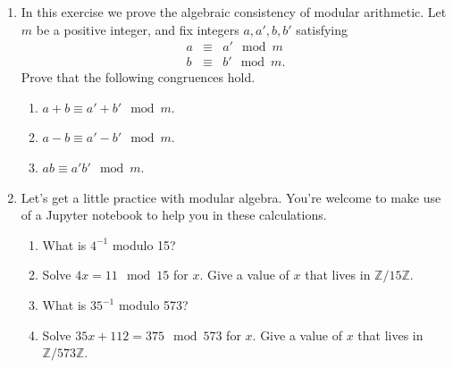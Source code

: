 \documentclass[11pt]{article}
\newcommand{\bZ}{\mathbb{Z}}
\begin{document}
\begin{enumerate}
{\begin{enumerate}
{    }
  \end{enumerate}
  }
  \item{
  In this exercise we prove the algebraic consistency of modular arithmetic.  Let $m$ be a positive integer, and fix integers $a,a',b,b'$ satisfying
  \begin{eqnarray*}
    a&\equiv& a'\mod m\\
    b&\equiv& b'\mod m.
  \end{eqnarray*}
  Prove that the following congruences hold.
  \begin{enumerate}
    \item{
    $a+b\equiv a'+b'\mod m$.
    }
    \item{
    $a-b\equiv a'-b'\mod m$.
    }
    \item{
    $ab\equiv a'b'\mod m$.
    }
  \end{enumerate}
  }
  \item{
  Let's get a little practice with modular algebra.  You're welcome to make use of a Jupyter notebook to help you in these calculations.
  \begin{enumerate}
    \item{
    What is $4^{-1}$ modulo 15?
    }
    \item{
    Solve $4x = 11 \mod 15$ for $x$.  Give a value of $x$ that lives in $\bZ/15\bZ$.
    }
    \item{
    What is $35^{-1}$ modulo 573?
    }
    \item{
    Solve $35x + 112 = 375\mod 573$ for $x$.  Give a value of $x$ that lives in $\bZ/573\bZ$.
    }
  \end{enumerate}
  }
\end{enumerate}
\end{document}
